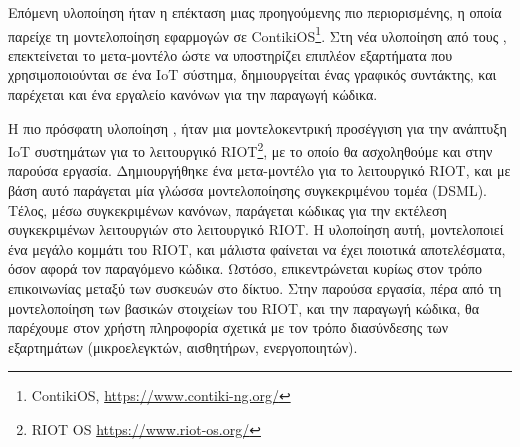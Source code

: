Επόμενη υλοποίηση ήταν η επέκταση μιας προηγούμενης \cite{bib:durmaz_2017} πιο περιορισμένης, η οποία παρείχε τη μοντελοποίηση εφαρμογών σε ContikiOS\footnote{ContikiOS, \url{https://www.contiki-ng.org/}}. Στη νέα υλοποίηση από τους \citet{bib:karaduman_2019}, επεκτείνεται το μετα-μοντέλο ώστε να υποστηρίζει επιπλέον εξαρτήματα που χρησιμοποιούνται σε ένα IoT σύστημα, δημιουργείται ένας γραφικός συντάκτης, και παρέχεται και ένα εργαλείο κανόνων για την παραγωγή κώδικα.

Η πιο πρόσφατη υλοποίηση \cite{bib:karaduman_2020}, ήταν μια μοντελοκεντρική προσέγγιση για την ανάπτυξη IoT συστημάτων για το λειτουργικό RIOT\footnote{RIOT OS \url{https://www.riot-os.org/}}, με το οποίο θα ασχοληθούμε και στην παρούσα εργασία. Δημιουργήθηκε ένα μετα-μοντέλο για το λειτουργικό RIOT, και με βάση αυτό παράγεται μία γλώσσα μοντελοποίησης συγκεκριμένου τομέα (DSML). Τέλος, μέσω συγκεκριμένων κανόνων, παράγεται κώδικας για την εκτέλεση συγκεκριμένων λειτουργιών στο λειτουργικό RIOT. Η υλοποίηση αυτή, μοντελοποιεί ένα μεγάλο κομμάτι του RIOT, και μάλιστα φαίνεται να έχει ποιοτικά αποτελέσματα, όσον αφορά τον παραγόμενο κώδικα. Ωστόσο, επικεντρώνεται κυρίως στον τρόπο επικοινωνίας μεταξύ των συσκευών στο δίκτυο. Στην παρούσα εργασία, πέρα από τη μοντελοποίηση των βασικών στοιχείων του RIOT, και την παραγωγή κώδικα, θα παρέχουμε στον χρήστη πληροφορία σχετικά με τον τρόπο διασύνδεσης των εξαρτημάτων (μικροελεγκτών, αισθητήρων, ενεργοποιητών).
